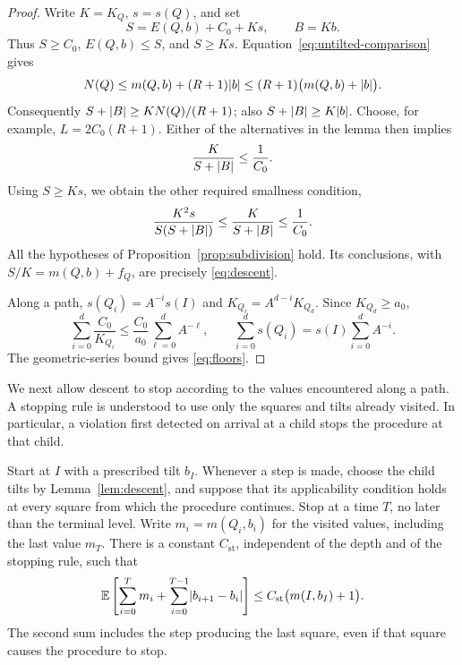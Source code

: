 \begin{proof}
Write \(K=K_Q\), \(s=s(Q)\), and set
\[
 S=E(Q,b)+C_0+Ks,\qquad B=Kb.
\]
Thus \(S\ge C_0\), \(E(Q,b)\le S\), and \(S\ge Ks\).
Equation~\eqref{eq:untilted-comparison} gives
\[
 N(Q)\le m(Q,b)+(R+1)\lvert b\rvert
       \le (R+1)\bigl(m(Q,b)+\lvert b\rvert\bigr).
\]
Consequently \(S+\lvert B\rvert\ge KN(Q)/(R+1)\); also
\(S+\lvert B\rvert\ge K\lvert b\rvert\).
Choose, for example, \(L=2C_0(R+1)\).
Either of the alternatives in the lemma then implies
\[
 \frac{K}{S+\lvert B\rvert}\le \frac1{C_0}.
\]
Using \(S\ge Ks\), we obtain the other required smallness condition,
\[
 \frac{K^2s}{S(S+\lvert B\rvert)}
 \le \frac{K}{S+\lvert B\rvert}\le \frac1{C_0}.
\]
All the hypotheses of Proposition~\ref{prop:subdivision} hold.
Its conclusions, with \(S/K=m(Q,b)+f_Q\), are precisely
\eqref{eq:descent}.

Along a path, \(s(Q_i)=A^{-i}s(I)\) and
\(K_{Q_i}=A^{d-i}K_{Q_d}\).  Since \(K_{Q_d}\ge a_0\),
\[
 \sum_{i=0}^d \frac{C_0}{K_{Q_i}}
 \le \frac{C_0}{a_0}\sum_{\ell=0}^d A^{-\ell},
 \qquad
 \sum_{i=0}^d s(Q_i)
 =s(I)\sum_{i=0}^d A^{-i}.
\]
The geometric-series bound gives \eqref{eq:floors}.
\end{proof}

We next allow descent to stop according to the values encountered
along a path.  A stopping rule is understood to use only the squares
and tilts already visited.  In particular, a violation first detected
on arrival at a child stops the procedure at that child.

\begin{lemma}\label{lem:stopped-descent}
Start at \(I\) with a prescribed tilt \(b_I\).  Whenever a step is
made, choose the child tilts by Lemma~\ref{lem:descent}, and suppose
that its applicability condition holds at every square from which
the procedure continues.  Stop at a time \(T\), no later than the
terminal level.  Write \(m_i=m(Q_i,b_i)\) for the visited values,
including the last value \(m_T\).  There is a constant
\(C_{\mathrm{st}}\), independent of the depth and of the stopping
rule, such that
\begin{equation}\label{eq:stopped-descent}
 \mathbb E\left[
      \sum_{i=0}^{T}m_i
      +\sum_{i=0}^{T-1}\lvert b_{i+1}-b_i\rvert
    \right]
 \le C_{\mathrm{st}}\bigl(m(I,b_I)+1\bigr).
\end{equation}
The second sum includes the step producing the last square, even if
that square causes the procedure to stop.
\end{lemma}

